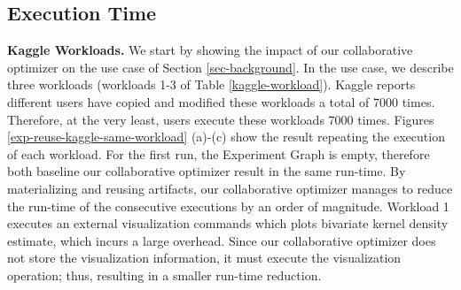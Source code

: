 \subsection{Execution Time}
\textbf{Kaggle Workloads.}
We start by showing the impact of our collaborative optimizer on the use case of Section \ref{sec-background}.
In the use case, we describe three workloads (workloads 1-3 of Table \ref{kaggle-workload}).
Kaggle reports different users have copied and modified these workloads a total of 7000 times.
Therefore, at the very least, users execute these workloads 7000 times.
Figures \ref{exp-reuse-kaggle-same-workload} (a)-(c) show the result repeating the execution of each workload.
For the first run, the Experiment Graph is empty, therefore both baseline our collaborative optimizer result in the same run-time.
By materializing and reusing artifacts, our collaborative optimizer manages to reduce the run-time of the consecutive executions by an order of magnitude.
Workload 1 executes an external visualization commands which plots bivariate kernel density estimate, which incurs a large overhead.
Since our collaborative optimizer does not store the visualization information, it must execute the visualization operation; thus, resulting in a smaller run-time reduction.
